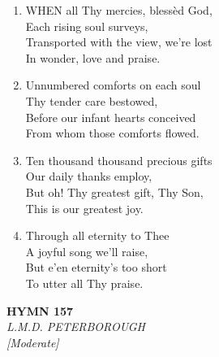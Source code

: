 \begin{enumerate}
    \item WHEN all Thy mercies, bless\`ed God, \\
        Each rising soul surveys, \\
        Transported with the view, we're lost \\
        In wonder, love and praise.

    \item Unnumbered comforts on each soul \\
        Thy tender care bestowed, \\
        Before our infant hearts conceived \\
        From whom those comforts flowed.

    \item Ten thousand thousand precious gifts \\
        Our daily thanks employ, \\
        But oh! Thy greatest gift, Thy Son, \\
        This is our greatest joy.

    \item Through all eternity to Thee \\
        A joyful song we'll raise, \\
        But e'en eternity's too short \\
        To utter all Thy praise.

\end{enumerate}

\newpage
\begin{center}
    {\Large \textbf{HYMN 157}}
    \\
    \textit{L.M.D. PETERBOROUGH}
    \\
    \textit{\small [Moderate]}
\end{center}
\vspace{1em}

